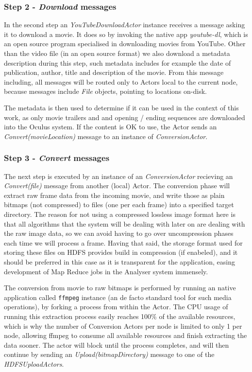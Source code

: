 \subsubsection{Step 2 - \textit{Download} messages}
In the second step an \textit{YouTubeDownloadActor} instance receives a message asking it to download a movie.
It does so by invoking the native app \textit{youtube-dl}, which is an open source program specialised in downloading movies from YouTube.
Other than the video file (in an open source format) we also download a metadata description during this step, such metadata includes for example the date of publication, author, title and description of the movie. From this message including, all messages will be routed only to Actors local to the current node, because messages include \textit{File} objects, pointing to locations on-disk.

The metadata is then used to determine if it can be used in the context of this work, as only movie trailers and and opening / ending sequences are downloaded into the Oculus system. If the content is OK to use, the Actor sends an \textit{Convert(movieLocation)} message to an instance of \textit{ConversionActor}.

\subsubsection{Step 3 - \textit{Convert} messages}
The next step is executed by an instance of an \textit{ConversionActor} recieving an \textit{Convert(file)} message from another (local) Actor. The conversion phase will extract raw frame data from the incoming movie, and write those as plain bitmaps (not compressed) to files (one per each frame) into a specified target directory. The reason for not using a compressed lossless image format here is that all algorithms that the system will be dealing with later on are dealing with the raw image data, so we can avoid having to go over uncompression phases each time we will process a frame. Having that said, the storage format used for storing these files on HDFS provides build in compression (if enabeled), and it should be preferred in this case as it is transparent for the application, easing development of Map Reduce jobs in the Analyser system immensely.

The conversion from movie to raw bitmaps is performed by running an native application called \verb|ffmpeg| \cite{ffmpeg} instance (an de facto standard tool for such media operations), by forking a process from within the Actor. The CPU usage of running this extraction process easily reaches 100\% of the available resources, which is why the number of Conversion Actors per node is limited to only 1 per node, allowing ffmpeg to consume all available resources and finish extracting the data sooner. The actor will block until the process completes, and will then continue by sending an \textit{Upload(bitmapDirectory)} message to one of the \textit{HDFSUploadActors}.

